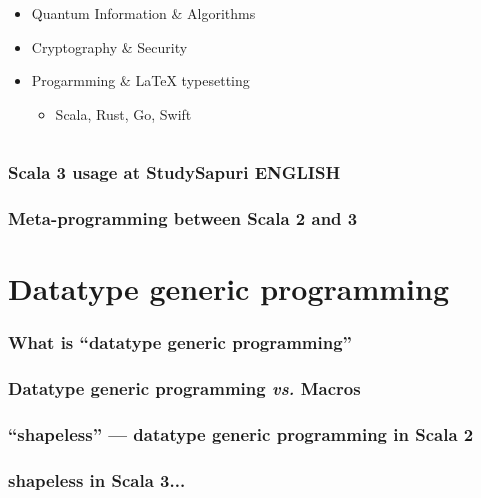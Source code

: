 \begin{frame}
\begin{columns}
\begin{column}{0.7\textwidth}
\begin{itemize}
        \item Quantum Information \& Algorithms

        \item Cryptography \& Security
        
        \item Progarmming \& {\LaTeX} typesetting
        \begin{itemize}
          \item Scala, Rust, Go, Swift
        \end{itemize}
      \end{itemize}
    \end{column}
  \end{columns}
\end{frame}

\begin{frame}
  \frametitle{Scala 3 usage at StudySapuri ENGLISH}
\end{frame}

\begin{frame}
  \frametitle{Meta-programming between Scala 2 and 3}
\end{frame}

\section{Datatype generic programming}

\begin{frame}
  \frametitle{What is ``datatype generic programming''}
\end{frame}

\begin{frame}
  \frametitle{Datatype generic programming \textit{vs.} Macros}
\end{frame}

\begin{frame}
  \frametitle{``shapeless'' --- datatype generic programming in Scala 2}
\end{frame}

\begin{frame}
  \frametitle{shapeless in Scala 3...}
\end{frame}



